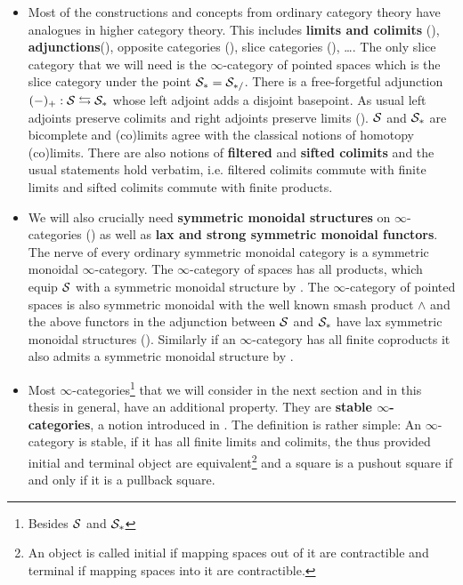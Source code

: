 \begin{itemize}
    \item Most of the constructions and concepts from ordinary category theory have analogues in higher category theory. This includes \textbf{limits and colimits} (\cite[Section~1.2.3, Chapter~4]{HigherToposTheory}), \textbf{adjunctions}(\cite[\href{https://kerodon.net/tag/02EJ}{Tag 02EJ}]{kerodon}), opposite categories (\cite[Section~1.2.1]{HigherToposTheory}), slice categories (\cite[Section~1.2.9]{HigherToposTheory}), \dots. The only slice category that we will need is the $\infty$-category of pointed spaces which is the slice category under the point $\mathcal{S}_*=\mathcal{S}_{*/}$. There is a free-forgetful adjunction $(-)_+:\mathcal{S}\leftrightarrows \mathcal{S}_*$ whose left adjoint adds a disjoint basepoint. As usual left adjoints preserve colimits and right adjoints preserve limits (\cite[Proposition~5.2.3.5]{HigherToposTheory}). $\mathcal{S}$ and $\mathcal{S}_*$ are bicomplete and (co)limits agree with the classical notions of homotopy (co)limits. There are also notions of \textbf{filtered }and \textbf{sifted colimits }and the usual statements hold verbatim, i.e. filtered colimits commute with finite limits and sifted colimits commute with finite products.
    \item We will also crucially need \textbf{symmetric monoidal structures} on $\infty$-categories (\cite[Definition~2.0.0.7]{lurie2017higher}) as well as \textbf{lax and strong symmetric monoidal functors}. The nerve of every ordinary symmetric monoidal category is a symmetric monoidal $\infty$-category.
    The $\infty$-category of spaces has all products, which equip $\mathcal{S}$ with a symmetric monoidal structure by \cite[Section~2.4.1]{lurie2017higher}.
    The $\infty$-category of pointed spaces is also symmetric monoidal with the well known smash product $\wedge$ and the above functors in the adjunction between $\mathcal{S}$ and $\mathcal{S}_*$ have lax symmetric monoidal structures (\cite[Theorem~2.2.2.4]{lurie2017higher}). Similarly if an $\infty$-category has all finite coproducts it also admits a symmetric monoidal structure by \cite[Section~2.4.3]{lurie2017higher}. 
    \item Most $\infty$-categories\footnote{Besides $\mathcal{S}$ and $\mathcal{S}_*$} that we will consider in the next section and in this thesis in general, have an additional property. They are \textbf{stable $\infty$-categories}, a notion introduced in \cite[Section~1.1]{lurie2017higher}.
    The definition is rather simple: An $\infty$-category is stable, if it has all finite limits and colimits, the thus provided initial and terminal object are equivalent\footnote{An object is called initial if mapping spaces out of it are contractible and terminal if mapping spaces into it are contractible.} and a square is a pushout square if and only if it is a pullback square. 

\end{itemize}
